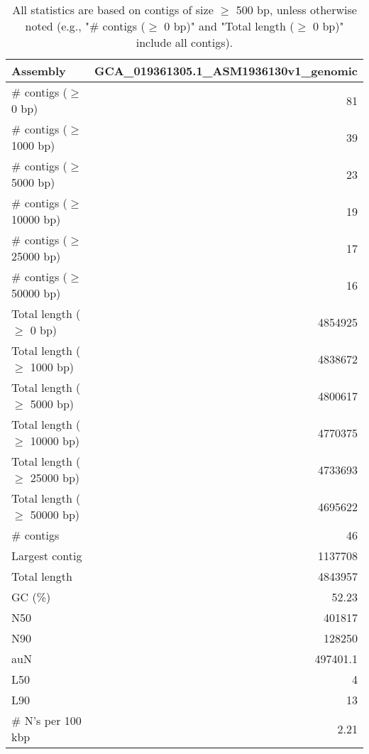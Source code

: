 \documentclass[12pt,a4paper]{article}
\begin{document}
\begin{table}[ht]
\begin{center}
\caption{All statistics are based on contigs of size $\geq$ 500 bp, unless otherwise noted (e.g., "\# contigs ($\geq$ 0 bp)" and "Total length ($\geq$ 0 bp)" include all contigs).}
\begin{tabular}{|l*{1}{|r}|}
\hline
Assembly & GCA\_019361305.1\_ASM1936130v1\_genomic \\ \hline
\# contigs ($\geq$ 0 bp) & 81 \\ \hline
\# contigs ($\geq$ 1000 bp) & 39 \\ \hline
\# contigs ($\geq$ 5000 bp) & 23 \\ \hline
\# contigs ($\geq$ 10000 bp) & 19 \\ \hline
\# contigs ($\geq$ 25000 bp) & 17 \\ \hline
\# contigs ($\geq$ 50000 bp) & 16 \\ \hline
Total length ($\geq$ 0 bp) & 4854925 \\ \hline
Total length ($\geq$ 1000 bp) & 4838672 \\ \hline
Total length ($\geq$ 5000 bp) & 4800617 \\ \hline
Total length ($\geq$ 10000 bp) & 4770375 \\ \hline
Total length ($\geq$ 25000 bp) & 4733693 \\ \hline
Total length ($\geq$ 50000 bp) & 4695622 \\ \hline
\# contigs & 46 \\ \hline
Largest contig & 1137708 \\ \hline
Total length & 4843957 \\ \hline
GC (\%) & 52.23 \\ \hline
N50 & 401817 \\ \hline
N90 & 128250 \\ \hline
auN & 497401.1 \\ \hline
L50 & 4 \\ \hline
L90 & 13 \\ \hline
\# N's per 100 kbp & 2.21 \\ \hline
\end{tabular}
\end{center}
\end{table}
\end{document}
